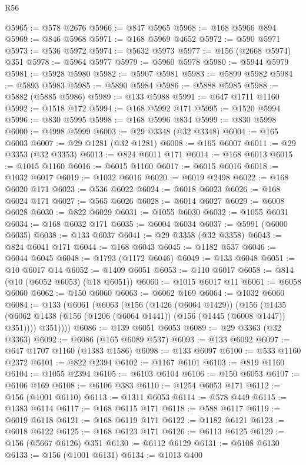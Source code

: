 \begin{lexlean}{R56}
\begin{coremodule}
@5965 := @578 @2676
@5966 := @847 @5965
@5968 := @168 @5966 @894
@5969 := @846 @5968
@5971 := @168 @5969 @4652
@5972 := @590 @5971
@5973 := @536 @5972
@5974 := @5632 @5973
@5977 := @156 (@2668 @5974) @351
@5978 := @5964 @5977
@5979 := @5960 @5978
@5980 := @5944 @5979
@5981 := @5928 @5980
@5982 := @5907 @5981
@5983 := @5899 @5982
@5984 := @5893 @5983
@5985 := @5890 @5984
@5986 := @5888 @5985
@5988 := @5882 (@5885 @5986)
@5989 := @133 @5988
@5991 := @647 @1711 @1160
@5992 := @1518 @172
@5994 := @168 @5992 @171
@5995 := @1520 @5994
@5996 := @830 @5995
@5998 := @168 @5996 @834
@5999 := @830 @5998
@6000 := @4998 @5999
@6003 := @29 @3348 (@32 @3348)
@6004 := @165 @6003
@6007 := @29 @1281 (@32 @1281)
@6008 := @165 @6007
@6011 := @29 @3353 (@32 @3353)
@6013 := @824 @6011 @171
@6014 := @168 @6013
@6015 := @1015 @1160
@6016 := @6015 @1160
@6017 := @6015 @6016
@6018 := @1032 @6017
@6019 := @1032 @6016
@6020 := @6019 @2498
@6022 := @168 @6020 @171
@6023 := @536 @6022
@6024 := @6018 @6023
@6026 := @168 @6024 @171
@6027 := @565 @6026
@6028 := @6014 @6027
@6029 := @6008 @6028
@6030 := @822 @6029
@6031 := @1055 @6030
@6032 := @1055 @6031
@6034 := @168 @6032 @171
@6035 := @6004 @6034
@6037 := @5991 (@6000 @6035)
@6038 := @133 @6037
@6041 := @29 @3358 (@32 @3358)
@6043 := @824 @6041 @171
@6044 := @168 @6043
@6045 := @1182 @537
@6046 := @6044 @6045
@6048 := @1793 (@1172 @6046)
@6049 := @133 @6048
@6051 := @10 @6017 @14
@6052 := @1409 @6051
@6053 := @110 @6017
@6058 := @814 (@10 (@6052 @6053) (@18 @6051))
@6060 := @1015 @6017 @11
@6061 := @6058 @6060
@6062 := @150 @6060
@6063 := @6062 @169
@6064 := @1032 @6060
@6084 := @133
    (@6061
      (@6063
        (@156
          (@1426 (@6064 @1429))
          (@156
            (@1435 (@6062 @1438 (@156 (@1206 (@6064 @1441)) (@156 (@1445 (@6008 @1447)) @351))))
            @351))))
@6086 := @139 @6051 @6053
@6089 := @29 @3363 (@32 @3363)
@6092 := @6086 (@165 @6089 @537)
@6093 := @133 @6092
@6097 := @647 @1707 @1160 (@1383 @1586)
@6098 := @133 @6097
@6100 := @533 @1160 @2372
@6101 := @822 @2394
@6102 := @1167 @6101
@6103 := @819 @1160
@6104 := @1055 @2394
@6105 := @6103 @6104
@6106 := @150 @6053
@6107 := @6106 @169
@6108 := @6106 @383
@6110 := @1254 @6053 @171
@6112 := @156 (@1001 @6110)
@6113 := @1311 @6053
@6114 := @578 @449
@6115 := @1383 @6114
@6117 := @168 @6115 @171
@6118 := @588 @6117
@6119 := @6019 @6118
@6121 := @168 @6119 @171
@6122 := @1182 @6121
@6123 := @6018 @6122
@6125 := @168 @6123 @171
@6126 := @6113 @6125
@6129 := @156 (@5667 @6126) @351
@6130 := @6112 @6129
@6131 := @6108 @6130
@6133 := @156 (@1001 @6131)
@6134 := @1013 @400

\end{coremodule}
\end{lexlean}
